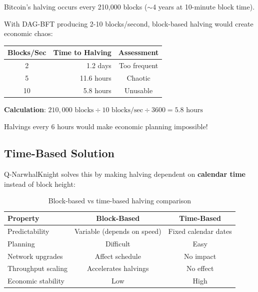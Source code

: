 \documentclass[11pt,a4paper]{article}
\begin{document}
\begin{tcolorbox}[colback=secondarycolor!10, colframe=secondarycolor, title=Problem: Block-Based Halving with High Throughput]
Bitcoin's halving occurs every 210,000 blocks ($\sim$4 years at 10-minute block time).

With DAG-BFT producing 2-10 blocks/second, block-based halving would create economic chaos:

\begin{table}[h]
\centering
\begin{tabular}{crc}
\toprule
\textbf{Blocks/Sec} & \textbf{Time to Halving} & \textbf{Assessment} \\
\midrule
2 & 1.2 days & Too frequent \\
5 & 11.6 hours & Chaotic \\
10 & 5.8 hours & Unusable \\
\bottomrule
\end{tabular}
\end{table}

\textbf{Calculation}: $210,000 \text{ blocks} \div 10 \text{ blocks/sec} \div 3600 = 5.8 \text{ hours}$

Halvings every 6 hours would make economic planning impossible!
\end{tcolorbox}

\subsection{Time-Based Solution}

Q-NarwhalKnight solves this by making halving dependent on \textbf{calendar time} instead of block height:

\begin{table}[h]
\centering
\begin{tabular}{lcc}
\toprule
\textbf{Property} & \textbf{Block-Based} & \textbf{Time-Based} \\
\midrule
Predictability & Variable (depends on speed) & Fixed calendar dates \\
Planning & Difficult & Easy \\
Network upgrades & Affect schedule & No impact \\
Throughput scaling & Accelerates halvings & No effect \\
Economic stability & Low & High \\
\bottomrule
\end{tabular}
\caption{Block-based vs time-based halving comparison}
\end{table}
\end{document}
